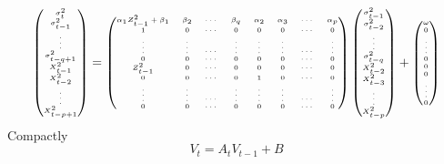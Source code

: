 \documentclass{beamer}
\begin{document}
\begin{frame}
  \begin{equation*}
    \begin{tiny}
      \begin{pmatrix}
        \sigma_{t}^2 \\
        \sigma_{t-1}^2 \\
        \vdots \\
        \sigma_{t-q+1}^2 \\
        X_{t-1}^2 \\
        X_{t-2}^2 \\
        \vdots \\
        X_{t-p+1}^2
      \end{pmatrix} =
      \begin{pmatrix}
        \alpha_1 Z_{t-1}^2 + \beta_1 & \beta_2 & \cdots & \beta_q & \alpha_2 & \alpha_3 & \cdots & \alpha_p \\
        1 & 0 & \cdots & 0 & 0 & 0 & \cdots & 0 \\
        \vdots & \vdots & \cdots & \vdots & \vdots & \vdots & \cdots & \vdots \\
        0 & 0 & \cdots & 0 & 0 & 0 & \cdots & 0 \\
        Z_{t-1}^2 & 0 & \cdots & 0 & 0 & 0 & \cdots & 0 \\
        0 & 0 & \cdots & 0 & 1 & 0 & \cdots & 0 \\
        \vdots & \vdots & \cdots & \vdots & \vdots & \vdots & \cdots & \vdots \\
        0 & 0 & \cdots & 0 & 0 & 0 & \cdots & 0 \\    
      \end{pmatrix}
      \begin{pmatrix}
        \sigma_{t-1}^2 \\
        \sigma_{t-2}^2 \\
        \vdots \\
        \sigma_{t-q}^2 \\
        X_{t-2}^2 \\
        X_{t-3}^2 \\
        \vdots \\
        X_{t-p}^2
      \end{pmatrix} +
      \begin{pmatrix}
        \omega \\
        0 \\
        \vdots \\
        0 \\
        0 \\
        0 \\
        \vdots \\
        0 \\
      \end{pmatrix}
      \end{tiny}
    \end{equation*}
    Compactly
    \[
    V_t = A_t V_{t-1} + B
    \]
  \end{frame}
\end{document}

